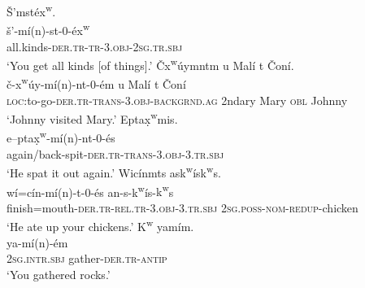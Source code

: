 \documentclass[output=paper,colorlinks,citecolor=brown]{langscibook}
\begin{document}
\ea
\label{ex-thomason-30}
\v{S}{\textcrlambda}'mst\'ex\textsuperscript w. \\
\gll \v{s}{\textcrlambda}'-m\'i(n)-st-0-\'e{x\textsuperscript w} \\
all.kinds-\textsc{der.tr}-\textsc{tr}-3.\textsc{obj}-\textsc{2sg}.\textsc{tr.sbj} \\
\glt `You get all kinds [of things].'
\ex 
\label{ex-thomason-31}
\v{C}{x\textsuperscript w}\'uymntm {\textltilde}u Mal\'i t \v{C}on\'i. \\
 \gll  \v{c}-{x\textsuperscript w}\'uy-m\'i(n)-nt-0-\'em {\textltilde}u Mal\'i t \v{C}on\'i \\
\textsc{loc}:to-go-\textsc{der.tr-trans}-3.\textsc{obj}-\textsc{backgrnd.ag} 2ndary Mary \textsc{obl} Johnny \\
 \glt `Johnny visited Mary.'
 \ex 
\label{ex-thomason-32}
E{\textltilde}pta{\d{x}\textsuperscript w}mis. \\
\gll e{\textltilde}--pta{\d{x}\textsuperscript w}-m\'i(n)-nt-0-\'es \\ again/back-spit-\textsc{der.tr-trans}-3.\textsc{obj}-3.\textsc{tr.sbj} \\
\glt `He spat it out again.'
\ex 
\label{ex-thomason-33}
Wic\'inm{\textltilde}ts ask\textsuperscript w\'is{k\textsuperscript w}s. \\
\gll w\'i\textglotstop=c\'in-m\'i(n)-{\textltilde}t-0-\'es
 an-s-k\textsuperscript w\'is-{k\textsuperscript w}s \\
finish=mouth-\textsc{der.tr-rel.tr}-3.\textsc{obj}-3.\textsc{tr.sbj}
\textsc{2sg}.\textsc{poss}-\textsc{nom-redup}-chicken \\
\glt `He ate up your chickens.'
\ex 
\label{ex-thomason-34}
{K\textsuperscript w} ya{\textglotstop}m\'im. \\
 ya\textglotstop-m\'i(n)-\'em \\ 
\textsc{2sg}.\textsc{intr.sbj} gather-\textsc{der.tr-antip} \\    
\glt `You gathered rocks.'
\z
\end{document}
